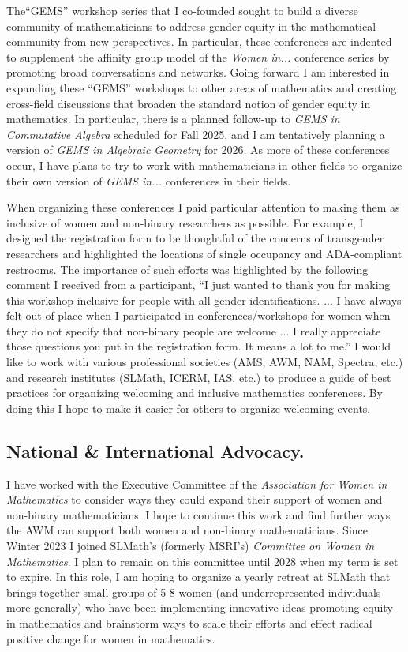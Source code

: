 \documentclass[11pt,reqno]{amsart}
\theoremstyle{remark}
\begin{document}
The``GEMS'' workshop series that I co-founded sought to build a diverse community of mathematicians to address gender equity in the mathematical community from new perspectives. In particular, these conferences are indented to supplement the affinity group model of the \textit{Women in...} conference series by promoting broad conversations and networks. Going forward I am interested in expanding these ``GEMS'' workshops to other areas of mathematics and creating cross-field discussions that broaden the standard notion of gender equity in mathematics. In particular, there is a planned follow-up to \textit{GEMS in Commutative Algebra} scheduled for Fall 2025, and I am tentatively planning a version of \textit{GEMS in Algebraic Geometry} for 2026. As more of these conferences occur, I have plans to try to work with mathematicians in other fields to organize their own version of \textit{GEMS in...} conferences in their fields. 

When organizing these conferences I paid particular attention to making them as inclusive of women and non-binary researchers as possible. For example, I designed the registration form to be thoughtful of the concerns of transgender researchers and highlighted the locations of single occupancy and ADA-compliant restrooms. The importance of such efforts was highlighted by the following comment I received from a participant, ``I just wanted to thank you for making this workshop inclusive for people with all gender identifications. ... I have always felt out of place when I participated in conferences/workshops for women when they do not specify that non-binary people are welcome ... I really appreciate those questions you put in the registration form. It means a lot to me.'' I would like to work with various professional societies (AMS, AWM, NAM, Spectra, etc.) and research institutes (SLMath, ICERM, IAS, etc.) to produce a guide of best practices for organizing welcoming and inclusive mathematics conferences. By doing this I hope to make it easier for others to organize welcoming events. 

\subsection{ National \& International Advocacy.} I have worked with the Executive Committee of the \textit{Association for Women in Mathematics} to consider ways they could expand their support of women and non-binary mathematicians. I hope to continue this work and find further ways the AWM can support both women and non-binary mathematicians. Since Winter 2023 I joined SLMath's (formerly MSRI's)  \textit{Committee on Women in Mathematics}. I plan to remain on this committee until 2028 when my term is set to expire. In this role, I am hoping to organize a yearly retreat at SLMath that brings together small groups of 5-8 women (and underrepresented individuals more generally) who have been implementing innovative ideas promoting equity in mathematics and brainstorm ways to scale their efforts and effect radical positive change for women in mathematics.  
\end{document}
